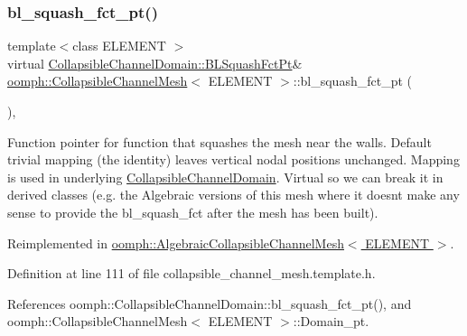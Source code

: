 \subsubsection{\texorpdfstring{bl\+\_\+squash\+\_\+fct\+\_\+pt()}{bl\_squash\_fct\_pt()}\hspace{0.1cm}{\footnotesize\ttfamily [1/2]}}
{\footnotesize\ttfamily template$<$class E\+L\+E\+M\+E\+NT $>$ \\
virtual \hyperlink{classoomph_1_1CollapsibleChannelDomain_a2bf1d7943bfac134a5c27a54c7e1faed}{Collapsible\+Channel\+Domain\+::\+B\+L\+Squash\+Fct\+Pt}\& \hyperlink{classoomph_1_1CollapsibleChannelMesh}{oomph\+::\+Collapsible\+Channel\+Mesh}$<$ E\+L\+E\+M\+E\+NT $>$\+::bl\+\_\+squash\+\_\+fct\+\_\+pt (\begin{DoxyParamCaption}{ }\end{DoxyParamCaption})\hspace{0.3cm}{\ttfamily [inline]}, {\ttfamily [virtual]}}



Function pointer for function that squashes the mesh near the walls. Default trivial mapping (the identity) leaves vertical nodal positions unchanged. Mapping is used in underlying \hyperlink{classoomph_1_1CollapsibleChannelDomain}{Collapsible\+Channel\+Domain}. Virtual so we can break it in derived classes (e.\+g. the Algebraic versions of this mesh where it doesn\textquotesingle{}t make any sense to provide the bl\+\_\+squash\+\_\+fct after the mesh has been built). 



Reimplemented in \hyperlink{classoomph_1_1AlgebraicCollapsibleChannelMesh_abf1848b49f57419af4379a637464587d}{oomph\+::\+Algebraic\+Collapsible\+Channel\+Mesh$<$ E\+L\+E\+M\+E\+N\+T $>$}.



Definition at line 111 of file collapsible\+\_\+channel\+\_\+mesh.\+template.\+h.



References oomph\+::\+Collapsible\+Channel\+Domain\+::bl\+\_\+squash\+\_\+fct\+\_\+pt(), and oomph\+::\+Collapsible\+Channel\+Mesh$<$ E\+L\+E\+M\+E\+N\+T $>$\+::\+Domain\+\_\+pt.

\mbox{\label{classoomph_1_1CollapsibleChannelMesh_a5c073c93cce7e6b6e9de86f36cb1e965}} 
